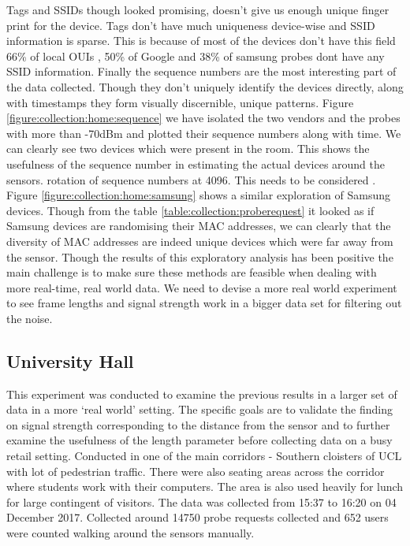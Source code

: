 Tags and SSIDs though looked promising, doesn't give us enough unique finger print for the device.
Tags don't have much uniqueness device-wise and SSID information is sparse.
This is because of most of the devices don't have this field 66\% of local OUIs , 50\% of Google and 38\% of samsung probes dont have any SSID information.
Finally the sequence numbers are the most interesting part of the data collected. Though they don't uniquely identify the devices directly, along with timestamps they form visually discernible, unique patterns.
Figure \ref{figure:collection:home:sequence} we have isolated the two vendors and the probes with more than -70dBm and plotted their sequence numbers along with time. We can clearly see two devices which were present in the room. This shows the usefulness of the sequence number in estimating the actual devices around the sensors.
rotation of sequence numbers at 4096. This needs to be considered .
Figure \ref{figure:collection:home:samsung} shows a similar exploration of Samsung devices.
Though from the table \ref{table:collection:proberequest} it looked as if Samsung devices are randomising their MAC addresses, we can clearly that the diversity of MAC addresses are indeed unique devices which were far away from the sensor.
Though the results of this exploratory analysis has been positive the main challenge is to make sure these methods are feasible when dealing with more real-time, real world data.
We need to devise a more real world experiment to see frame lengths and signal strength work in a bigger data set for filtering out the noise. 
\subsection{University Hall}
This experiment was conducted to examine the previous results in a larger set of data in a more `real world' setting.
The specific goals are to validate the finding on signal strength corresponding to the distance from the sensor and to further examine the usefulness of the length parameter before collecting data on a busy retail setting.
Conducted in one of the main corridors - Southern cloisters of UCL with lot of pedestrian traffic.
There were also seating areas across the corridor where students work with their computers.
The area is also used heavily for lunch for large contingent of visitors.
The data was collected from 15:37 to 16:20 on 04 December 2017.
Collected around 14750 probe requests collected and 652 users were counted walking around the sensors manually.

